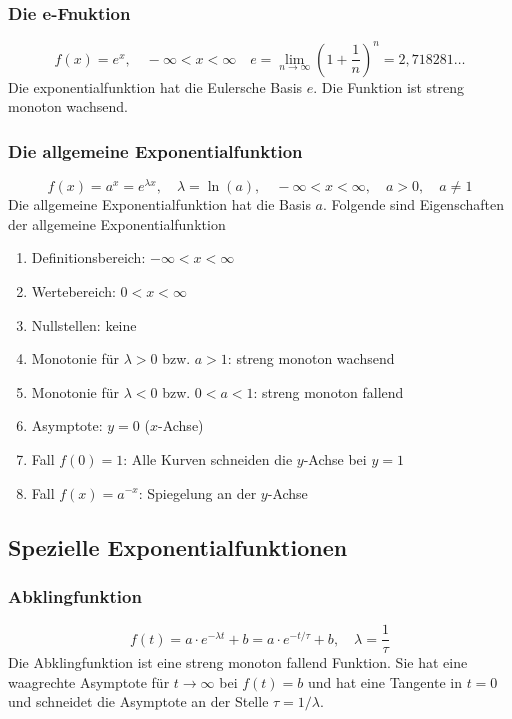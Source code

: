 \subsubsection{Die e-Fnuktion}
\begin{equation}
\boxed{f\left(x\right)=e^x,\quad -\infty <x <\infty}\quad \boxed{e=\displaystyle \lim_{n\rightarrow \infty}\left(1+\dfrac{1}{n}\right)^n=2,718281\dotso}
\end{equation}
Die exponentialfunktion hat die Eulersche Basis $e$. Die Funktion ist streng monoton wachsend.
\subsubsection{Die allgemeine Exponentialfunktion}
\begin{equation}
\boxed{f\left(x\right)=a^x=e^{\lambda x},\quad \lambda = \ln\left(a\right),\quad -\infty < x < \infty,\quad a>0,\quad a\neq 1}
\end{equation}
Die allgemeine Exponentialfunktion hat die Basis $a$. Folgende sind Eigenschaften der allgemeine Exponentialfunktion
\begin{enumerate}[$(a)$]
\item Definitionsbereich: $-\infty < x < \infty$
\item Wertebereich: $0 < x < \infty$
\item Nullstellen: keine
\item Monotonie für $\lambda > 0$ bzw. $a>1$: streng monoton wachsend
\item Monotonie für $\lambda < 0$ bzw. $0<a<1$: streng monoton fallend
\item Asymptote: $y=0$ ($x$-Achse)
\item Fall $f\left(0\right)=1$: Alle Kurven schneiden die $y$-Achse bei $y=1$
\item Fall $f\left(x\right)=a^{-x}$: Spiegelung an der $y$-Achse
\end{enumerate}
\subsection{Spezielle Exponentialfunktionen}
\subsubsection{Abklingfunktion}
\begin{equation}
\boxed{f\left(t\right)=a\cdot e^{-\lambda t}+b=a\cdot e^{-t/\tau}+b,\quad \lambda=\dfrac{1}{\tau}}
\end{equation}
Die Abklingfunktion ist eine streng monoton fallend Funktion. Sie hat eine waagrechte Asymptote für $t\rightarrow \infty$ bei $f\left(t\right)=b$ und hat eine Tangente in $t=0$ und schneidet die Asymptote an der Stelle $\tau=1/\lambda$.

